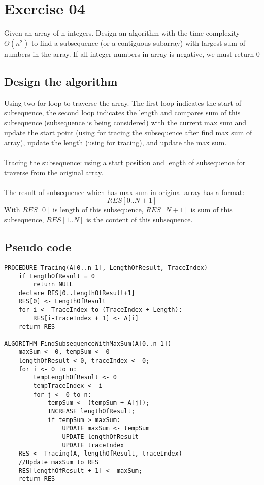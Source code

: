 \documentclass[a4paper]{article}
\begin{document}
\section{Exercise 04}
Given an array of n integers. Design an algorithm with the time complexity $\Theta(n^2)$ to find a subsequence (or a contiguous subarray) with largest sum of numbers in the array. If all integer numbers in array is negative, we must return 0
\subsection{Design the algorithm}
Using two for loop to traverse the array. The first loop indicates the start of subsequence, the second loop indicates the length and compares sum of this subsequence (subsequence is being considered) with the current max sum and update the start point (using for tracing the subsequence after find max sum of array), update the length (using for tracing), and update the max sum. \\ 
\\
Tracing the subsequence: using a start position and length of subsequence for traverse from the original array. \\
\\
The result of subsequence which has max sum in original array has a format:
\begin{equation*}
    RES[0..N+1]
\end{equation*}
With $RES[0]$ is length of this subsequence, $RES[N+1]$ is sum of this subsequence, $RES[1..N]$ is the content of this subsequence.
\subsection{Pseudo code}
\begin{lstlisting}
PROCEDURE Tracing(A[0..n-1], LengthOfResult, TraceIndex) 
    if LengthOfResult = 0
        return NULL
    declare RES[0..LengthOfResult+1]
    RES[0] <- LengthOfResult
    for i <- TraceIndex to (TraceIndex + Length):
        RES[i-TraceIndex + 1] <- A[i]
    return RES
    
ALGORITHM FindSubsequenceWithMaxSum(A[0..n-1])
    maxSum <- 0, tempSum <- 0
    lengthOfResult <-0, traceIndex <- 0;
    for i <- 0 to n:
        tempLengthOfResult <- 0
        tempTraceIndex <- i
        for j <- 0 to n:
            tempSum <- (tempSum + A[j]);
            INCREASE lengthOfResult;
            if tempSum > maxSum:
                UPDATE maxSum <- tempSum
                UPDATE lengthOfResult
                UPDATE traceIndex
    RES <- Tracing(A, lengthOfResult, traceIndex)
    //Update maxSum to RES
    RES[lengthOfResult + 1] <- maxSum;
    return RES
\end{lstlisting}
\end{document}
